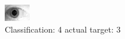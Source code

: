 \begin{figure}[h!]
\begin{center}
\includegraphics[width=0.60\columnwidth]{figures/ID1898_class_4_target_3.png}
\end{center}
\caption{ Classification: 4 actual target: 3}
\label{fig:ID1898_class_4_target_3}
\end{figure}
